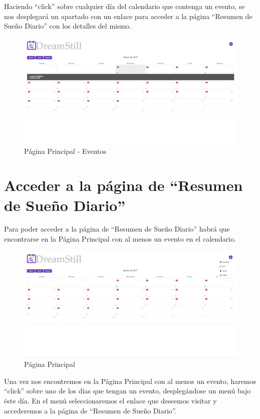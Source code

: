 \documentclass[11pt,openany]{book}
\begin{document}
Haciendo ``click'' sobre cualquier día del calendario que contenga un evento, se nos desplegará un apartado con un enlace para acceder a la página ``Resumen de Sueño Diario'' con los detalles del mismo.

\begin{figure}[H]
\centering
\includegraphics[totalheight=6cm]{manualUsuario/eventos.png}
\caption{Página Principal - Eventos}
\end{figure}

\section{Acceder a la página de ``Resumen de Sueño Diario''}

Para poder acceder a la página de ``Resumen de Sueño Diario'' habrá que encontrarse en la Página Principal con al menos un evento en el calendario.

\begin{figure}[H]
\centering
\includegraphics[totalheight=6cm]{manualUsuario/paginaPrincipal.png}
\caption{Página Principal}
\end{figure}

Una vez nos encontremos en la Página Principal con al menos un evento, haremos ``click'' sobre uno de los días que tengan un evento, desplegándose un menú bajo éste día. En el menú seleccionaremos el enlace que deseemos visitar y accederemos a la página de ``Resumen de Sueño Diario''.
\end{document}

